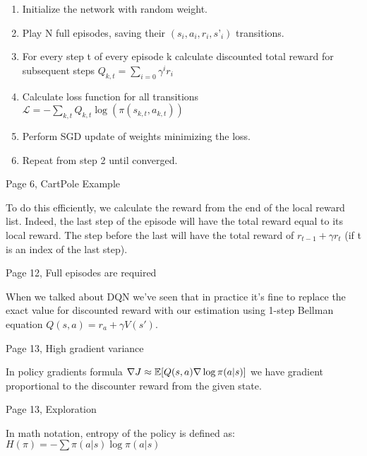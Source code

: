 \begin{enumerate}
\item Initialize the network with random weight.
\item Play N full episodes, saving their \begin{math}(s_i, a_i, r_i, s’_i)\end{math} transitions.
\item
  For every step t of every episode k calculate discounted total reward for
  subsequent steps \begin{math}Q_{k,t} = \sum_{i=0}\gamma^ir_i\end{math}
\item Calculate loss function for all transitions \begin{math}\mathcal{L} =
  -\sum_{k,t}Q_{k,t}\log(\pi(s_{k,t}, a_{k,t}))\end{math}
\item Perform SGD update of weights minimizing the loss.
\item Repeat from step 2 until converged.  
\end{enumerate}


Page 6, CartPole Example

To do this efficiently, we calculate the reward from the end of the local reward list. Indeed, the last step of the episode will have the total reward equal to its local reward. The step before the last will have the total reward of 
\begin{math}r_{t-1} + \gamma r_t\end{math} (if t is an index of the last step).


Page 12, Full episodes are required

When we talked about DQN we’ve seen that in practice it’s fine to replace the
exact value for discounted reward with our estimation using 1-step Bellman
equation \begin{math}Q(s, a) = r_a + \gamma V(s')\end{math}.


Page 13, High gradient variance

In policy gradients formula \begin{math}\nabla J \approx \operatorname{\mathbb{E}}[Q(s, a) \nabla\log \pi(a|s)]\end{math} we have gradient
proportional to the discounter reward from the given state.

Page 13, Exploration

In math notation, entropy of the policy is defined as: \begin{math}H(\pi) =
  -\sum \pi(a|s)\log \pi(a|s)\end{math}

